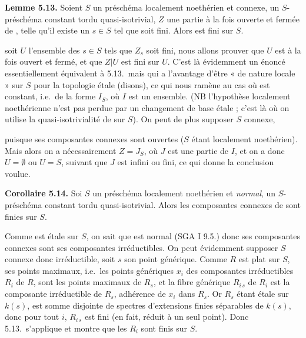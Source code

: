 \documentclass[11pt,a4paper]{article}
\begin{document}
\textbf{Lemme 5.13.} Soient $S$ un préschéma localement noethérien et
connexe,  un $S$-préschéma constant tordu quasi-isotrivial, $Z$ une
partie à la fois ouverte et fermée de , telle qu'il existe un
$s \in S$ tel que  soit fini. Alors  est fini sur $S$.

  soit $U$ l'ensemble des $s \in S$ tels que $Z_s$ soit fini,
nous allons prouver que $U$ est à la fois ouvert et fermé, et que $Z|U$ est
fini sur $U$. C'est là évidemment un \struck{\ill{}} énoncé essentiellement
équivalent à 5.13.\ mais qui a l'avantage d'être « de nature locale » sur
$S$ pour la topologie étale (disons), ce qui nous ramène au cas où 
est constant, i.e.\ de la forme $I_S$, où $I$ est un ensemble. (NB
l'hypothèse localement noethérienne n'est pas perdue par un changement de
base étale ; c'est là où on utilise la quasi-isotrivialité de  sur
$S$). On peut de plus supposer $S$ connexe, 

\struck{\ill{}} puisque ses composantes connexes sont ouvertes ($S$ étant
localement noethérien). Mais alors on a nécessairement $Z = J_S$, où $J$ est
une partie de $I$, et on a \struck{\ill{}} donc $U = \emptyset$ ou $U = S$,
suivant que $J$ est infini ou fini, ce qui donne la conclusion voulue.

\textbf{Corollaire 5.14.} Soi $S$ un préschéma localement
noethérien et \emph{normal},  un $S$-préschéma 
constant tordu quasi-isotrivial. Alors les composantes connexes de
 sont finies sur $S$.

Comme  est étale sur $S$, on sait que  est normal (SGA I
9.5.) donc ses composantes  connexes sont ses
composantes irréductibles. On peut évidemment supposer $S$ connexe donc
irréductible, soit $s$ son point générique. Comme $R$ est plat sur $S$,
ses points maximaux, i.e.\ les points génériques $x_i$ des composantes
irréductibles $R_i$ de $R$, sont les points maximaux de $R_s$, et la fibre
 générique $R_{i\,s}$ de $R_i$ est la composante irréductible
de $R_s$, adhérence de $x_i$ dans $R_s$. Or $R_s$ étant étale sur $k(s)$,
est somme disjointe de spectres d'extensions finies séparables de $k(s)$,
donc  pour tout $i$, $R_{i\,s}$ est fini (en fait, réduit à un
seul point). Donc 5.13.\ s'applique et montre que les $R_i$ sont finis sur
$S$.
\end{document}
